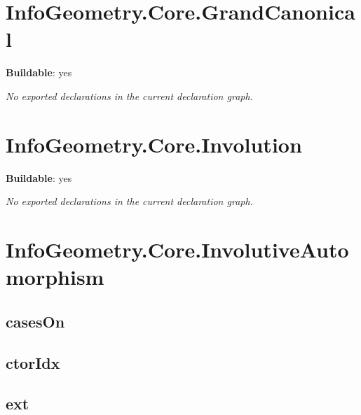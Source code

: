 \section{InfoGeometry.Core.GrandCanonical}

\noindent\textbf{Buildable}: yes

\noindent\emph{No exported declarations in the current declaration graph.}

\section{InfoGeometry.Core.Involution}

\noindent\textbf{Buildable}: yes

\noindent\emph{No exported declarations in the current declaration graph.}

\section{InfoGeometry.Core.InvolutiveAutomorphism}

\subsection*{casesOn}

\begin{theorem}[blueprint="infogeometry:core:involutiveautomorphism:caseson"]
\end{theorem}

\subsection*{ctorIdx}

\begin{theorem}[blueprint="infogeometry:core:involutiveautomorphism:ctoridx"]
\end{theorem}

\subsection*{ext}

\begin{theorem}[blueprint="infogeometry:core:involutiveautomorphism:ext"]
\end{theorem}

